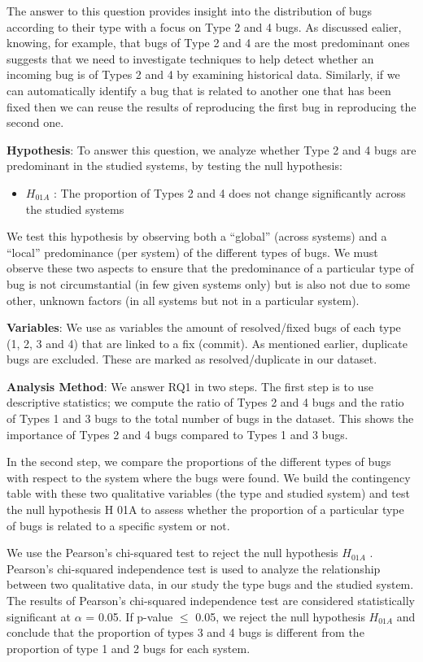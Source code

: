 The answer to this question provides insight into the
distribution of bugs according to their type with a focus on
Type 2 and 4 bugs. As discussed ealier, knowing, for
example, that bugs of Type 2 and 4 are the most predominant
ones suggests that we need to investigate techniques to help
detect whether an incoming bug is of Types 2 and 4 by
examining historical data. Similarly, if we can automatically
identify a bug that is related to another one that has been fixed
then we can reuse the results of reproducing the first bug in
reproducing the second one.

{\bf Hypothesis}: To answer this question, we analyze whether
Type 2 and 4 bugs are predominant in the studied systems, by
testing the null hypothesis:

\begin{itemize}
	\item $H_{01A}$ : The proportion of Types 2 and 4 does not
change significantly across the studied systems
\end{itemize}


We test this hypothesis by observing both a “global”
(across systems) and a “local” predominance (per system) of
the different types of bugs. We must observe these two
aspects to ensure that the predominance of a particular type of
bug is not circumstantial (in few given systems only) but is
also not due to some other, unknown factors (in all systems
but not in a particular system).

{\bf Variables}: We use as variables the amount of resolved/fixed
bugs of each type (1, 2, 3 and 4) that are linked to a fix
(commit). As mentioned earlier, duplicate bugs are excluded.
These are marked as resolved/duplicate in our dataset.

{\bf Analysis Method}: We answer RQ1 in two steps. The first
step is to use descriptive statistics; we compute the ratio of
Types 2 and 4 bugs and the ratio of Types 1 and 3 bugs to the
total number of bugs in the dataset. This shows the
importance of Types 2 and 4 bugs compared to Types 1 and 3
bugs.

In the second step, we compare the proportions of the
different types of bugs with respect to the system where the
bugs were found. We build the contingency table with these
two qualitative variables (the type and studied system) and
test the null hypothesis H 01A to assess whether the proportion
of a particular type of bugs is related to a specific system or
not.

We use the Pearson's chi-squared test to reject the null
hypothesis $H_{01A}$ . Pearson’s chi-squared independence test is
used to analyze the relationship between two qualitative data,
in our study the type bugs and the studied system. The results
of Pearson’s chi-squared independence test are considered
statistically significant at $\alpha$ = 0.05. If p-value $\le$ 0.05, we
reject the null hypothesis $H_{01A}$ and conclude that the
proportion of types 3 and 4 bugs is different from the
proportion of type 1 and 2 bugs for each system.

